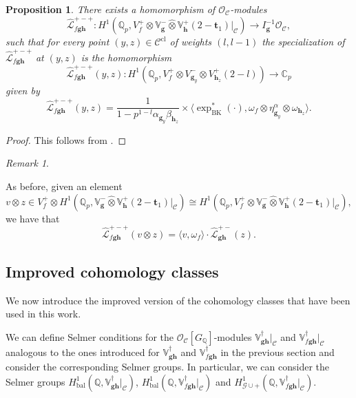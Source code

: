 \documentclass[a4paper,11pt]{amsart}
\theoremstyle{plain}
\newtheorem{propo}[theorem]{Proposition}
\theoremstyle{definition}
\theoremstyle{remark}
\newtheorem{remarkwr}[theorem]{Remark}
\newenvironment{remark}{\begin{remarkwr}\begin{upshape}}{\end{upshape}\end{remarkwr}}
\newcommand{\bb}{\mathbb}
\newcommand{\cl}{\mathcal}
\DeclareMathOperator{\BK}{BK}
\DeclareMathOperator{\bal}{bal}
\newcommand{\hg}{{\mathbf{g}}}
\newcommand{\hh}{{\mathbf h}}
\numberwithin{equation}{section}
\begin{document}
\begin{propo}\label{perrin-improved2}
There exists a homomorphism of $\mathcal{O}_{\cl{C}}$-modules
\[
\widehat{\mathcal L}_{f \hg \hh}^{+-+}: H^1(\mathbb{Q}_p, V_f^+\otimes\mathbb{V}_{\hg}^- \hat{\otimes} \mathbb{V}_{\hh}^+ (2-\mathbf{t}_1)|_{\mathcal C}) \rightarrow I_\hg^{-1} \cl{O}_{\cl{C}},
\]
such that for every point $(y,z) \in \mathcal{C}^{\mathrm{cl}}$ of weights $(l,l-1)$ the specialization of $\widehat{\mathcal L}_{f\hg \hh}^{+-+}$ at $(y,z)$ is the homomorphism
\[
\widehat{\mathcal L}_{{f\hg\hh}}^{+-+}(y,z): H^1(\mathbb Q_p, V_f^+\otimes V_{\hg_y}^- \otimes V_{\hh_z}^+(2-l)) \rightarrow \mathbb C_p
\]
given by
\[
\widehat{\mathcal L}_{{f\hg \hh}}^{+-+}(y,z) = \frac{1}{1-p^{1-l} \alpha_{\hg_y} \beta_{\hh_z}}  \times \langle \exp_{\BK}^*(\cdot), \omega_{f} \otimes\eta_{\hg_y}^\alpha \otimes \omega_{\hh_z} \rangle.
\]
\end{propo}
\begin{proof}
This follows from \cite[Lemma~9.4]{BSV}.
\end{proof}

\begin{remark}
As before, given an element
\[
v\otimes z\in V_f^+\otimes H^1(\mathbb{Q}_p,\mathbb{V}_{\hg}^- \hat{\otimes} \mathbb{V}_{\hh}^+ (2-\mathbf{t}_1)|_{\mathcal C}) \cong H^1(\mathbb{Q}_p, V_f^+\otimes\mathbb{V}_{\hg}^- \hat{\otimes} \mathbb{V}_{\hh}^+ (2-\mathbf{t}_1)|_{\mathcal C}),
\]
we have that
\[
\widehat{\cl{L}}_{f\hg\hh}^{+-+}(v\otimes z)=\langle v,\omega_f\rangle\cdot \widehat{\cl{L}}_{\hg\hh}^{+-}(z).
\]
\end{remark}

\subsection{Improved cohomology classes}

We now introduce the improved version of the cohomology classes that have been used in this work. %

We can define Selmer conditions for the $\cl{O}_{\cl{C}}[G_{\bb{Q}}]$-modules $\bb{V}_{\hg\hh}^\dagger\vert_{\cl{C}}$ and $\bb{V}_{f\hg\hh}^\dagger\vert_{\cl{C}}$ analogous to the ones introduced for $\bb{V}_{\hg\hh}^\dagger$ and $\bb{V}_{f\hg\hh}^\dagger$ in the previous section and consider the corresponding Selmer groups. In particular, we can consider the Selmer groups $H^1_{\bal}(\bb{Q},\bb{V}_{\hg\hh}^\dagger\vert_{\cl{C}})$, $H^1_{\bal}(\bb{Q},\bb{V}_{f\hg\hh}^\dagger\vert_{\cl{C}})$ and $H^1_{\cl{G}\cup +}(\bb{Q},\bb{V}_{f\hg\hh}^\dagger\vert_{\cl{C}})$.
\end{document}
